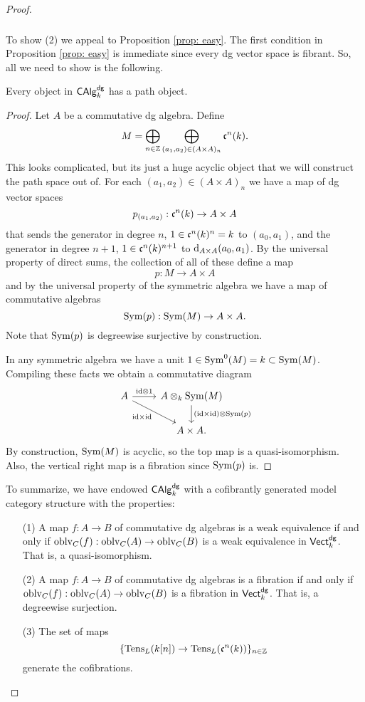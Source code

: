 \documentclass[11pt]{amsart}
\begin{document}
\begin{proof}
\subsubsection{}

To show (2) we appeal to Proposition \ref{prop: easy}. 
The first condition in Proposition \ref{prop: easy} is immediate since every dg vector space is fibrant. 
So, all we need to show is the following. 

\begin{lem}
Every object in ${\sf CAlg}^{\sf dg}_k$ has a path object.
\end{lem}
\begin{proof}
Let $A$ be a commutative dg algebra. 
Define
\[
M = \bigoplus_{n \in \mathbb Z} \bigoplus_{(a_1,a_2) \in (A \times A)_n} \mathfrak c^n(k) .
\]
This looks complicated, but its just a huge acyclic object that we will construct the path space out of. 
For each $(a_1,a_2) \in (A \times A)_n$ we have a map of dg vector spaces
\[
p_{(a_1,a_2)} : \mathfrak c^n(k) \to A \times A
\]
that sends the generator in degree $n$, $1 \in \mathfrak c^n(k)^n = k$ to $(a_0,a_1)$, and the generator in degree $n+1$, $1 \in \mathfrak c^n(k)^{n+1}$ to ${\rm d}_{A \times A} (a_0, a_1)$. 
By the universal property of direct sums, the collection of all of these define a map
\[
p : M \to A \times A
\]
and by the universal property of the symmetric algebra we have a map of commutative algebras
\[
{\rm Sym}(p) : {\rm Sym}(M) \to A \times A .
\]
Note that ${\rm Sym}(p)$ is degreewise surjective by construction. 

In any symmetric algebra we have a unit $1 \in {\rm Sym}^0(M) = k \subset {\rm Sym}(M)$. 
Compiling these facts we obtain a commutative diagram
\[
\begin{tikzcd}
A \ar[r, "\id \tensor 1"] \ar[dr, "\id \times \id"'] & A \tensor_k \Sym(M) \ar[d, "(\id \times \id) \tensor \Sym(p)"] \\
& A \times A .
\end{tikzcd}
\]
By construction, ${\rm Sym}(M)$ is acyclic, so the top map is a quasi-isomorphism. 
Also, the vertical right map is a fibration since ${\rm Sym}(p)$ is. 
\end{proof}

To summarize, we have endowed ${\sf CAlg}^{\sf dg}_k$ with a cofibrantly generated model category structure with the properties:
\begin{itemize}
\item[(1)] A map $f : A \to B$ of commutative dg algebras is a weak equivalence if and only if ${\rm oblv}_C(f) : {\rm oblv}_C(A) \to {\rm oblv}_C(B)$ is a weak equivalence in ${\sf Vect}^{\sf dg}_k$.
That is, a quasi-isomorphism. 
\item[(2)] A map $f : A \to B$ of commutative dg algebras is a fibration if and only if ${\rm oblv}_C(f) : {\rm oblv}_C(A) \to {\rm oblv}_C(B)$ is a fibration in ${\sf Vect}^{\sf dg}_k$.
That is, a degreewise surjection. 
\item[(3)] The set of maps
\[
\{{\rm Tens}_L(k[n]) \to {\rm Tens}_L (\mathfrak c^n(k))\}_{n \in \mathbb Z}
\]
generate the cofibrations. 
\end{itemize}



\end{proof}
\end{document}
